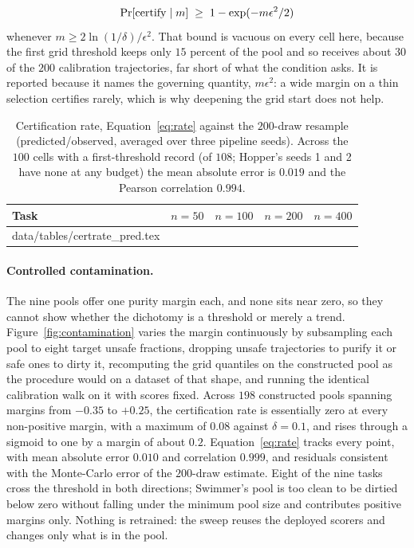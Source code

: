 \documentclass{article} %
\makeatletter
\newcommand{\tabinput}[1]{\@@input#1 }
\makeatother
\begin{document}
\[
  \Pr[\textnormal{certify} \mid m] \;\ge\; 1 - \exp(-m\epsilon^{2}/2)
\]
 whenever $m \ge 2\ln(1/\delta)/\epsilon^{2}$.
That bound is vacuous on every cell here, because the first grid threshold keeps only
$15$ percent of the pool and so receives about $30$ of the $200$ calibration
trajectories, far short of what the condition asks. It is reported because it names the
governing quantity, $m\epsilon^{2}$: a wide margin on a thin selection certifies rarely,
which is why deepening the grid start does not help.

\begin{table}[h]
\caption{Certification rate, Equation~\ref{eq:rate} against the $200$-draw resample
(predicted/observed, averaged over three pipeline seeds). Across the $100$ cells with a first-threshold record
(of $108$; Hopper's seeds 1 and 2 have none at any budget) the mean absolute error is
$0.019$ and the Pearson correlation $0.994$.}
\label{tab:certratepred}
\begin{center}
\scriptsize
\begin{tabular}{l rrrr}
\toprule
Task & $n = 50$ & $n = 100$ & $n = 200$ & $n = 400$ \\
\midrule
\tabinput{data/tables/certrate_pred.tex}
\bottomrule
\end{tabular}
\end{center}
\end{table}

\paragraph{Controlled contamination.} The nine pools offer one purity margin each, and
none sits near zero, so they cannot show whether the dichotomy is a threshold or merely
a trend. Figure~\ref{fig:contamination} varies the margin continuously by subsampling
each pool to eight target unsafe fractions, dropping unsafe trajectories to purify it or
safe ones to dirty it, recomputing the grid quantiles on the constructed pool as the
procedure would on a dataset of that shape, and running the identical calibration walk
on it with scores fixed. Across $198$ constructed pools spanning margins from $-0.35$ to
$+0.25$, the certification rate is essentially zero at every non-positive margin, with a
maximum of $0.08$ against $\delta = 0.1$, and rises through a sigmoid to one by a margin
of about $0.2$. Equation~\ref{eq:rate} tracks every point, with mean absolute error
$0.010$ and correlation $0.999$, and residuals consistent with the Monte-Carlo error of
the $200$-draw estimate. Eight of the nine tasks cross the threshold in both directions;
Swimmer's pool is too clean to be dirtied below zero without falling under the minimum
pool size and contributes positive margins only. Nothing is retrained: the sweep reuses
the deployed scorers and changes only what is in the pool.
\end{document}
